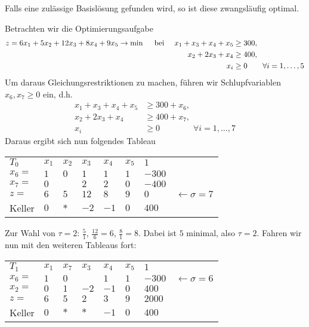 \begin{bemerkung} %
	Falls eine zulässige Basislösung gefunden wird, so ist diese zwangsläufig optimal.
\end{bemerkung}

\begin{beispiel}
	Betrachten wir die Optimierungsaufgabe
	\begin{equation*}
		\begin{aligned}
			z = 6x_1 + 5x_2 + 12x_3 + 8x_4 + 9x_5 \to \min \quad \text{ bei } \quad 
			x_1 + x_3 + x_4 + x_5 &\ge 300, \\
			x_2 + 2x_3 + x_4 &\ge 400, \\
			x_i &\ge 0 \qquad \forall i = 1, \dots, 5
		\end{aligned}
	\end{equation*}
	Um daraus Gleichungsrestriktionen zu machen, führen wir Schlupfvariablen $x_6, x_7 \ge 0$ ein, d.h.
	\begin{equation*}
		\begin{aligned}
			x_1 + x_3 + x_4 + x_5 &\ge 300 + x_6 , \\
			x_2 + 2x_3 + x_4 &\ge 400 + x_7, \\
			x_i &\ge 0 \qquad \qquad \forall i = 1, \dots, 7
		\end{aligned}
	\end{equation*}
	Daraus ergibt sich nun folgendes Tableau
	\begin{indentpar}
		\begin{tabular}{R{1cm}|R{.5cm}R{.5cm}R{.5cm}R{.5cm}R{.5cm}|R{.9cm}l}
			$T_0$ & $x_1$ & $x_2$ & $x_3$ & $x_4$ & $x_5$ & $1$ \\ 
			$x_6 =$ & $1$ & $0$ & $1$ & $1$ & $1$ & $-300$ \\
			$x_7 =$ & $0$ &  & $2$ & $2$ & $0$ & $-400$ \\ 
			$z =$   & $6$ & $5$ & $12$ & $8$ & $9$ & $0$ & $\leftarrow \sigma = 7$ \\ 
			Keller  & $0$ & $\ast$ & $-2$ & $-1$ & $0$ & $400$
		\end{tabular}
	\end{indentpar}
	
	Zur Wahl von $\tau = 2$: $\frac{5}{1}$, $\frac{12}{6} = 6$, $\frac{8}{1} = 8$. Dabei ist $5$ minimal, also $\tau = 2$.
	Fahren wir nun mit den weiteren Tableaus fort:
	
	\begin{indentpar}
		\begin{tabular}{R{1cm}|R{.5cm}R{.5cm}R{.5cm}R{.5cm}R{.5cm}|R{.9cm}l}
			$T_1$   & $x_1$ & $x_7$  & $x_3$      & $x_4$ & $x_5$ & $1$ \\ \cline{1-7}
			$x_6 =$ & $1$   & $0$    &  & $1$   & $1$   & $-300$ & $\leftarrow \sigma = 6$ \\
			$x_2 =$ & $0$   & $1$    & $-2$       & $-1$  & $0$   & $400$ \\ \cline{1-7}
			$z =$   & $6$   & $5$    & $2$        & $3$   & $9$   & $2000$ \\ \cline{1-7}
			Keller  & $0$   & $\ast$ & $\ast$ & $-1$  & $0$   & $400$
		\end{tabular}


\end{indentpar}
\end{beispiel}

